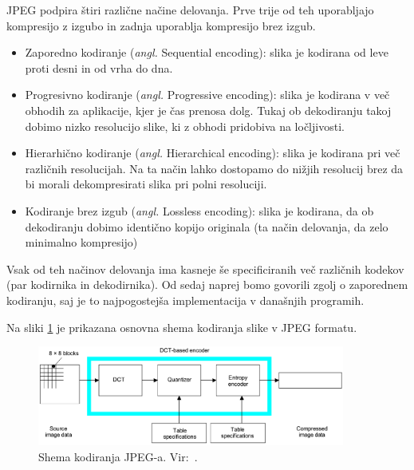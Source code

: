 \documentclass[a4paper,12pt,openright]{book}
\begin{document}
JPEG podpira štiri različne načine delovanja. Prve trije od teh uporabljajo kompresijo z izgubo in zadnja uporablja kompresijo brez izgub.
\begin{itemize}
   \item Zaporedno kodiranje (\textit{angl.} Sequential encoding): slika je kodirana od leve proti desni in od vrha do dna.
   \item Progresivno kodiranje (\textit{angl.} Progressive encoding): slika je kodirana v več obhodih za aplikacije, kjer je čas prenosa dolg. Tukaj ob dekodiranju takoj dobimo nizko resolucijo slike, ki z obhodi pridobiva na ločljivosti.
   \item Hierarhično kodiranje (\textit{angl.} Hierarchical encoding): slika je kodirana pri več različnih resolucijah. Na ta način lahko dostopamo do nižjih resolucij brez da bi morali dekompresirati slika pri polni resoluciji.
   \item Kodiranje brez izgub (\textit{angl.} Lossless encoding): slika je kodirana, da ob dekodiranju dobimo identično kopijo originala (ta način delovanja, da zelo minimalno kompresijo)
\end{itemize}
Vsak od teh načinov delovanja ima kasneje še specificiranih več različnih kodekov (par kodirnika in dekodirnika).
Od sedaj naprej bomo govorili zgolj o zaporednem kodiranju, saj je to najpogostejša implementacija v današnjih programih.\par
Na sliki \ref{Shema_JPEG} je prikazana osnovna shema kodiranja slike v JPEG formatu.
\begin{figure}[ht] %
\begin{center}
\includegraphics[width=0.9\textwidth]{slike/Shema_JPEG.pdf}
\end{center}
\caption{Shema kodiranja JPEG-a. Vir:~\cite{ISO/IEC_10918-1}.}
\label{Shema_JPEG}
\end{figure}
\end{document}
